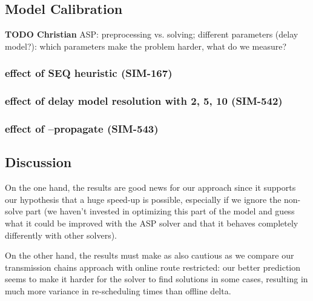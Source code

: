 \documentclass{article}
\begin{document}
\subsection{Model Calibration}\label{subsec:model_calibration}

\begin{mdframed}
{\bf TODO Christian} ASP: preprocessing vs. solving; different parameters (delay model?): which parameters make the problem harder, what do we measure?
\end{mdframed}

\subsubsection{effect of SEQ heuristic (SIM-167)}

\subsubsection{effect of delay model resolution with 2, 5, 10 (SIM-542)}

\subsubsection{effect of --propagate (SIM-543)}



\subsection{Discussion}\label{subsec:results_discussion}

On the one hand, the results are good news for our approach since it supports our hypothesis that a huge speed-up is possible, especially if we ignore the non-solve part (we haven't invested in optimizing this part of the model and guess what it could be improved with the ASP solver and that it behaves completely differently with other solvers).

On the other hand, the results must make as also cautious as we compare our  transmission chains approach with online route restricted: our better prediction seems to make it harder for the solver to find solutions in some cases, resulting in much more variance in re-scheduling times than offline delta.
\end{document}
